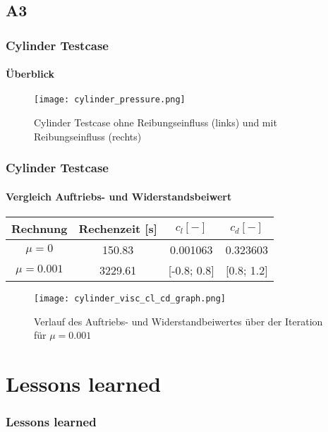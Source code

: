 \documentclass[
	11pt, %
	aspectratio=169, %
]{beamer}
\begin{document}
\subsection{A3}
\begin{frame}
\frametitle{Cylinder Testcase}
\framesubtitle{Überblick}
\begin{figure}
	\texttt{[image: cylinder\_pressure.png]}
	\caption{Cylinder Testcase ohne Reibungseinfluss (links) und mit Reibungseinfluss (rechts)}
\end{figure}




\end{frame}
\begin{frame}
	\frametitle{Cylinder Testcase}
	\framesubtitle{Vergleich Auftriebs- und Widerstandsbeiwert}
	\begin{center}
	\begin{tabular}{|c|c|c|c|}
		\hline
		Rechnung & Rechenzeit [s]& $c_l [-]$  & $c_d [-]$\\
		\hline
		$\mu = 0$ & 150.83 & 0.001063 & 0.323603\\
		\hline
		$\mu = 0.001$& 3229.61 & [-0.8; 0.8] & [0.8; 1.2]\\
		\hline
		\end{tabular}
	\end{center}
	\begin{figure}
		\texttt{[image: cylinder\_visc\_cl\_cd\_graph.png]}
		\caption{Verlauf des Auftriebs- und Widerstandbeiwertes über der Iteration für $\mu=0.001$}
	\end{figure}
\end{frame}



 \section{Lessons learned}

 \begin{frame}
 	\frametitle{Lessons learned}

 \end{frame}


\end{document}
